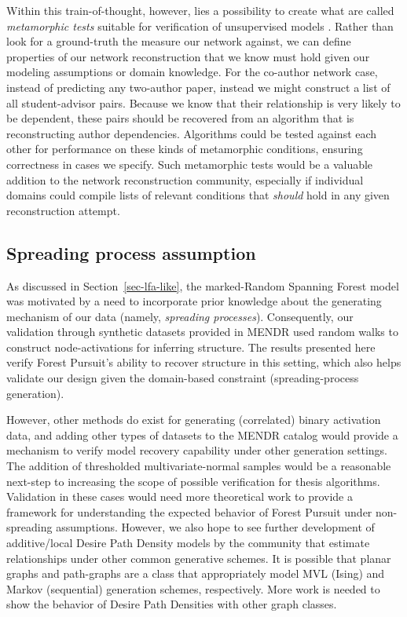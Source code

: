 \documentclass[%
	12pt,
		oneside,
		letterpaper
]{book}
\begin{document}
Within this train-of-thought, however, lies a possibility to create what are called \emph{metamorphic tests} suitable for verification of unsupervised models \autocite{METTLEMETamorphicTesting_Xie2020}.
Rather than look for a ground-truth the measure our network against, we can define properties of our network reconstruction that we know must hold given our modeling assumptions or domain knowledge.
For the co-author network case, instead of predicting any two-author paper, instead we might construct a list of all student-advisor pairs.
Because we know that their relationship is very likely to be dependent, these pairs should be recovered from an algorithm that is reconstructing author dependencies.
Algorithms could be tested against each other for performance on these kinds of metamorphic conditions, ensuring correctness in cases we specify.
Such metamorphic tests would be a valuable addition to the network reconstruction community, especially if individual domains could compile lists of relevant conditions that \emph{should} hold in any given reconstruction attempt.

\subsection{Spreading process assumption}\label{spreading-process-assumption}

As discussed in Section~\ref{sec-lfa-like}, the marked-Random Spanning Forest model was motivated by a need to incorporate prior knowledge about the generating mechanism of our data (namely, \emph{spreading processes}).
Consequently, our validation through synthetic datasets provided in MENDR used random walks to construct node-activations for inferring structure.
The results presented here verify Forest Pursuit's ability to recover structure in this setting, which also helps validate our design given the domain-based constraint (spreading-process generation).

However, other methods do exist for generating (correlated) binary activation data, and adding other types of datasets to the MENDR catalog would provide a mechanism to verify model recovery capability under other generation settings.
The addition of thresholded multivariate-normal samples \autocite{generationcorrelatedartificial_Leisch1998} would be a reasonable next-step to increasing the scope of possible verification for thesis algorithms.
Validation in these cases would need more theoretical work to provide a framework for understanding the expected behavior of Forest Pursuit under non-spreading assumptions.
However, we also hope to see further development of additive/local Desire Path Density models by the community that estimate relationships under other common generative schemes.
It is possible that planar graphs and path-graphs are a class that appropriately model MVL (Ising) and Markov (sequential) generation schemes, respectively.
More work is needed to show the behavior of Desire Path Densities with other graph classes.
\end{document}
